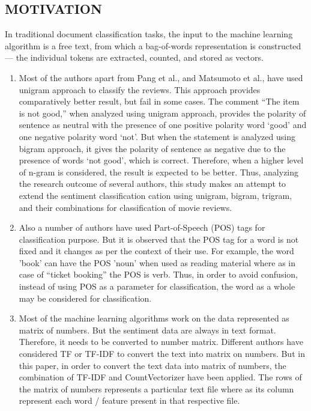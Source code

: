 \documentclass[10pt]{article}
\begin{document}
{\begin{center}
\section{MOTIVATION}

\end{center}

\par In traditional document classification tasks, the
input to the machine learning algorithm is a free text, from which a
bag-of-words representation is constructed — the individual tokens
are extracted, counted, and stored as vectors.
\begin{enumerate}[label=(\roman*)]
\item Most of the authors apart from Pang et al., and
Matsumoto et al., have used unigram approach to classify the reviews. 
This approach provides comparatively better
result, but fail in some cases. The comment “The item is not
good,” when analyzed using unigram approach, provides the
polarity of sentence as neutral with the presence of one positive 
polarity word ‘good’ and one negative polarity word ‘not’.
But when the statement is analyzed using bigram approach, it
gives the polarity of sentence as negative due to the presence
of words ‘not good’, which is correct. Therefore, when a higher
level of n-gram is considered, the result is expected to be 
better. Thus, analyzing the research outcome of several authors,
this study makes an attempt to extend the sentiment classification
cation using unigram, bigram, trigram, and their combinations
for classification of movie reviews.
\item Also a number of authors have used Part-of-Speech (POS) tags
for classification purpose. But it is observed that the POS tag
for a word is not fixed and it changes as per the context of
their use. For example, the word 'book' can have the POS 'noun'
when used as reading material where as in case 
of ``ticket booking'' the POS is verb. Thus, in order to avoid confusion, instead
of using POS as a parameter for classification, the word as a
whole may be considered for classification.
\item Most of the machine learning algorithms work on the data 
represented as matrix of numbers. But the sentiment data are 
always in text format. Therefore, it needs to be converted to
number matrix. Different authors have considered TF or TF-IDF
to convert the text into matrix on numbers. But in this paper,
in order to convert the text data into matrix of numbers, the
combination of TF-IDF and CountVectorizer have been applied.
The rows of the matrix of numbers represents a particular text
file where as its column represent each word / feature present
in that respective file.
\end{enumerate}
\newpage
\begin{center}

\end{center}}
\end{document}
